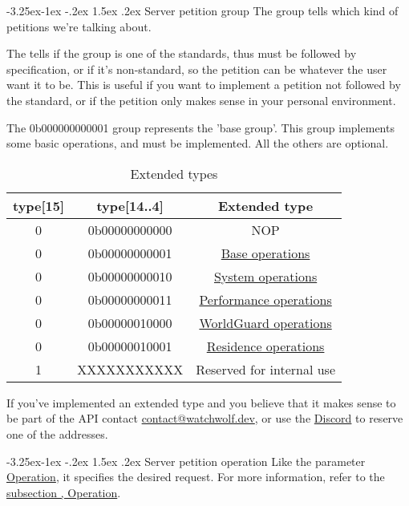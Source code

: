 \documentclass[11pt]{article}
\makeatletter
\renewcommand\subsection{\@startsection{subsection}{2}{\z@}%
                                         {-3.25ex\@plus -1ex \@minus -.2ex}%
                                         {1.5ex \@plus .2ex}%
                                         {\normalfont\fontfamily{phv}\fontsize{14}{17}\bfseries}}
\makeatother
\begin{document}
\subsection{Server petition group} \label{s:server-group}
The group tells which kind of petitions we're talking about.

The  tells if the group is one of the standards, thus must be followed by specification, or if it's non-standard, so the petition can be whatever the user want it to be. This is useful if you want to implement a petition not followed by the standard, or if the petition only makes sense in your personal environment.

The 0b000000000001 group represents the 'base group'. This group implements some basic operations, and must be implemented. All the others are optional.

\begin{table}[H]
	\centering
	\begin{tabular}{ |c|c|c| }
		\hline
		type[15] & type[14..4] & Extended type \\
		\hline
		0 & 0b00000000000 & NOP\footnotemark \\
		0 & 0b00000000001 & \hyperref[g:base]{Base operations} \\
		0 & 0b00000000010 & \hyperref[g:system]{System operations} \\
		0 & 0b00000000011 & \hyperref[g:performance]{Performance operations} \\
		0 & 0b00000010000 & \hyperref[g:worldguard]{WorldGuard operations} \\
		0 & 0b00000010001 & \hyperref[g:residence]{Residence operations} \\
		\hline
		1 &   XXXXXXXXXXX & Reserved for internal use \\
		\hline
	\end{tabular}
	\caption{Extended types}
\end{table}


If you've implemented an extended type and you believe that it makes sense to be part of the API contact \href{mailto:contact@watchwolf.dev?subject=WatchWolf - New extended type}{contact@watchwolf.dev}, or use the \href{https://discord.gg/PCD9MHRJ4W}{Discord} to reserve one of the addresses.

\subsection{Server petition operation} \label{s:server-operation}
Like the parameter \hyperref[s:operation]{Operation}, it specifies the desired request. For more information, refer to the \hyperref[s:operation]{subsection , Operation}.
\end{document}
